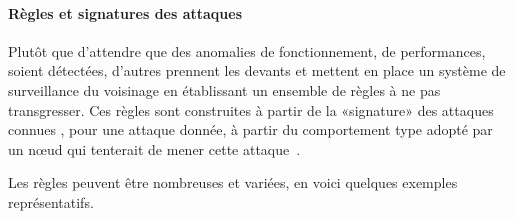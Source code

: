 \paragraph{Règles et signatures des attaques}\label{ea:par:rules}
Plutôt que d'attendre que des anomalies de fonctionnement, de performances, soient détectées, d'autres \IDS prennent les devants et mettent en place un système de surveillance du voisinage en établissant un ensemble de règles à ne pas transgresser.
Ces règles sont construites à partir de la «signature» des attaques connues \cad, pour une attaque donnée, à partir du comportement type adopté par un nœud qui tenterait de mener cette attaque~\cite{BMS13}.

Les règles peuvent être nombreuses et variées, en voici quelques exemples représentatifs.
